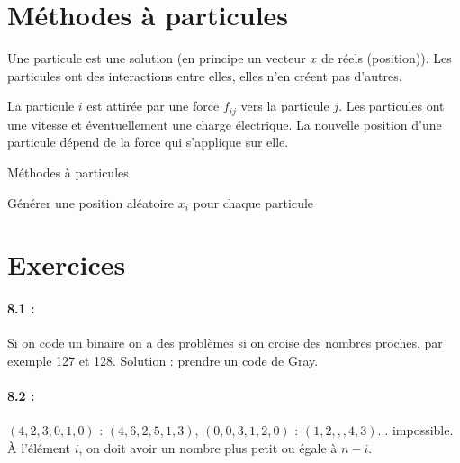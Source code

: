 \documentclass[11pt,a4paper]{report}
\begin{document}
\section{Méthodes à particules}

Une particule est une solution (en principe un vecteur $x$ de réels (position)). Les particules ont des interactions entre elles, elles n'en créent pas d'autres.

La particule $i$ est attirée par une force $f_{ij}$ vers la particule $j$. Les particules ont une vitesse et éventuellement une charge électrique. La nouvelle position d'une particule dépend de la force qui s'applique sur elle.

\begin{algorithm}[H]
\DontPrintSemicolon
\caption{Méthodes à particules}
    Générer une position aléatoire $x_i$ pour chaque particule\;
\end{algorithm}

\section{Exercices}

\paragraph*{8.1 : } Si on code un binaire on a des problèmes si on croise des nombres proches, par exemple 127 et 128. Solution : prendre un code de Gray.

\paragraph*{8.2 : } $(4,2,3,0,1,0)$ : $(4,6,2,5,1,3)$, $(0,0,3,1,2,0)$ : $(1,2,,,4,3)$... impossible. À l'élément $i$, on doit avoir un nombre plus petit ou égale à $n-i$.
\end{document}
